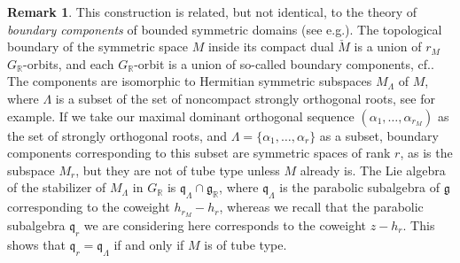 \documentclass[10pt]{amsart}
\let\cites\cite
\newcommand{\citestar}[3]{\cite[#3]{#1}}
\theoremstyle{plain}
\theoremstyle{definition}
\newtheorem{rema}[theo]{Remark}
\let\rgy r
\newcommand{\bR}{\mathbb{R}}
\newcommand{\fgg}{\mathfrak{g}}
\newcommand{\fq}{\mathfrak{q}}
\newcommand{\rkm}{{r_M}}
\providecommand{\eg}{e.g.}\providecommand{\ie}{i.e.}\providecommand{\etc}{etc.}\providecommand{\resp}{resp.}\providecommand{\cf}{cf.}
\begin{document}
\begin{rema}\label{rema:boundary-components}
This construction is related, but not identical, to the theory of \emph{boundary components} of
bounded symmetric domains (see
\eg \cites{WolfFineStructure,piatetski-shapiro,Satake,AshMumfordRapoportTai}). The
topological boundary of the symmetric space $M$ inside its compact dual $\check{M}$ is a union
of $r_M$ $G_\bR$-orbits, and each $G_\bR$-orbit is a union of so-called boundary components,
\cf \citestar{AshMumfordRapoportTai}*{Def.\,3.2 p.\,127}. The
components are isomorphic to Hermitian symmetric subspaces $M_\Lambda$ of $M$, where
$\Lambda$ is a subset of the set of noncompact strongly orthogonal roots, see
\citestar{AshMumfordRapoportTai}*{Th.\,3.3 p.\,127} for example. If we take our maximal dominant
orthogonal sequence $(\alpha_1,\ldots,\alpha_\rkm)$ as the set of strongly orthogonal roots, and
$\Lambda=\{\alpha_1,\ldots,\alpha_\rgy\}$ as a subset, boundary components corresponding to this subset
are symmetric spaces of rank $\rgy$, as is the subspace $M_\rgy$,
but they are not of tube type unless $M$ already is. The Lie algebra of the stabilizer of
$M_\Lambda$ in $G_\bR$ is $\fq_\Lambda\cap\fgg_\bR$, where $\fq_\Lambda$ is the parabolic subalgebra of $\fgg$
corresponding to the coweight $h_\rkm-h_\rgy$, whereas we recall that the parabolic subalgebra
$\fq_\rgy$ we are considering here corresponds to the coweight $z-h_\rgy$. This shows that
$\fq_\rgy=\fq_\Lambda$ if and only if $M$ is of tube type.
\end{rema}
\end{document}
